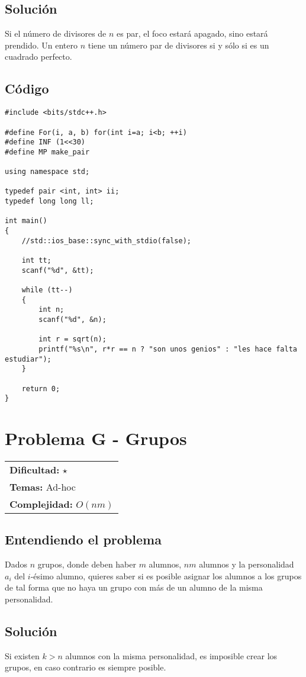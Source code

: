 \subsection*{Solución}
Si el número de divisores de $n$ es par, el foco estará apagado, sino estará prendido. Un entero $n$ tiene un número par de divisores si y sólo si es un cuadrado perfecto.
\subsection*{Código}
\begin{verbatim}
#include <bits/stdc++.h>
 
#define For(i, a, b) for(int i=a; i<b; ++i)
#define INF (1<<30)
#define MP make_pair
 
using namespace std;
 
typedef pair <int, int> ii;
typedef long long ll;
 
int main()
{
    //std::ios_base::sync_with_stdio(false);
 
    int tt;
    scanf("%d", &tt);
 
    while (tt--)
    {
        int n;
        scanf("%d", &n);
 
        int r = sqrt(n);
        printf("%s\n", r*r == n ? "son unos genios" : "les hace falta estudiar");
    }
 
    return 0;
}
\end{verbatim}

\section{Problema G - Grupos}

\hfill
\begin{tabular}{@{}l@{}}
\textbf{Dificultad:} $\star$ \\
\textbf{Temas:} Ad-hoc \\
\textbf{Complejidad:} $O(nm)$
\end{tabular}

\subsection*{Entendiendo el problema}
Dados $n$ grupos, donde deben haber $m$ alumnos, $nm$ alumnos y la personalidad $a_i$ del $i$-ésimo alumno, quieres saber si es posible asignar los alumnos a los grupos de tal forma que no haya un grupo con más de un alumno de la misma personalidad.
\subsection*{Solución}
Si existen $k > n$ alumnos con la misma personalidad, es imposible crear los grupos, en caso contrario es siempre posible.
